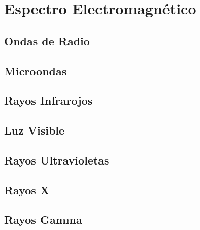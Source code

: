 \chapter{Espectro Electromagnético}\label{lbl-espectroElectromagnetico}

\section{Ondas de Radio}

\section{Microondas}

\section{Rayos Infrarojos}

\section{Luz Visible}

\section{Rayos Ultravioletas}

\section{Rayos X}

\section{Rayos Gamma}

